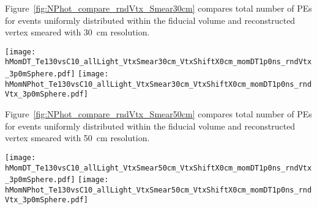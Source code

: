 Figure~\ref{fig:NPhot_compare_rndVtx_Smear30cm} compares total number of PEs for events uniformly
distributed within the fiducial volume and reconstructed vertex smeared with 30~cm resolution.

\begin{figure*}[ht]
  \centering
  \texttt{[image: hMomDT\_Te130vsC10\_allLight\_VtxSmear30cm\_VtxShiftX0cm\_momDT1p0ns\_rndVtx\_3p0mSphere.pdf]}
  \texttt{[image: hMomNPhot\_Te130vsC10\_allLight\_VtxSmear30cm\_VtxShiftX0cm\_momDT1p0ns\_rndVtx\_3p0mSphere.pdf]}
  \caption{(Left) Difference between measured PE arrival time and arrival time prediction based on
        vertex location (T$^{predicted} = |r_{hit} - r_{vtx}|/v_{phot}$, where $v_phot = c/1.53$).
        $\vbb$-decay (black solid line) and $\Cten$ events (magenta dashed line) are compared.
        Vertical line at 1~ns indicates cut for early light selection.
        (Right) Total number of PEs in the early light sample.
        $^{10}$C events with energy deposition in the $\pm$10\% energy range around Q-value. are
        selected. Verticies are uniformly distributed within the fiducial volume, $R<3$~m.
        {\bf Vetrex is smeared with 30~cm resolution.}}
\label{fig:NPhot_compare_rndVtx_Smear30cm}
\end{figure*}


Figure~\ref{fig:NPhot_compare_rndVtx_Smear50cm} compares total number of PEs for events uniformly
distributed within the fiducial volume and reconstructed vertex smeared with 50~cm resolution.

\begin{figure*}[ht]
  \centering
  \texttt{[image: hMomDT\_Te130vsC10\_allLight\_VtxSmear50cm\_VtxShiftX0cm\_momDT1p0ns\_rndVtx\_3p0mSphere.pdf]}
  \texttt{[image: hMomNPhot\_Te130vsC10\_allLight\_VtxSmear50cm\_VtxShiftX0cm\_momDT1p0ns\_rndVtx\_3p0mSphere.pdf]}
  \caption{(Left) Difference between measured PE arrival time and arrival time prediction based on
        vertex location (T$^{predicted} = |r_{hit} - r_{vtx}|/v_{phot}$, where $v_phot = c/1.53$).
        $\vbb$-decay (black solid line) and $\Cten$ events (magenta dashed line) are compared.
        Vertical line at 1~ns indicates cut for early light selection.
        (Right) Total number of PEs in the early light sample.
        $^{10}$C events with energy deposition in the $\pm$10\% energy range around Q-value are
        selected. Verticies are uniformly distributed within the fiducial volume, $R<3$~m.
        {\bf Vetrex is smeared with 50~cm resolution.}}
\label{fig:NPhot_compare_rndVtx_Smear50cm}
\end{figure*}



